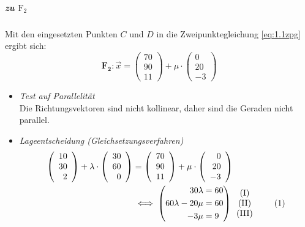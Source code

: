 \documentclass{ajc}
\numberwithin{equation}{subsection}
\newcommand\numberthis{\addtocounter{equation}{1}\tag{\theequation}}
\begin{document}
	\subparagraph{zu $\text{F}_2$} Mit den eingesetzten Punkten $C$ und $D$ in die Zweipunktegleichung \ref{eq:1.1zpg} ergibt sich: 
	\begin{equation}
		\mathbf{F_2}: \overrightarrow{x}=\left(\begin{array}{r} 70 \\ 90 \\ 11\end{array}\right) + \mu \cdot \left(\begin{array}{r} 0 \\ 20 \\ -3\end{array}\right)
	\end{equation}
	
	\begin{itemize}
		\item \textit{Test auf Parallelität} \\ 
		Die Richtungsvektoren sind nicht kollinear, daher sind die Geraden nicht parallel.
		
		\item \textit{Lageentscheidung (Gleichsetzungsverfahren)} \\
		\begin{alignat*}{2}
			\left(\begin{array}{r} 10 \\ 30 \\ 2\end{array}\right) + \lambda \cdot \left(\begin{array}{r} 30 \\ 60 \\ 0\end{array}\right) &= \left(\begin{array}{r} 70 \\ 90 \\ 11\end{array}\right) + \mu \cdot \left(\begin{array}{r} 0 \\ 20 \\ -3\end{array}\right) \\
			&\iff \left(\begin{aligned} 30 \lambda &= 60 \\ 60 \lambda - 20 \mu &= 60 \\ -3 \mu &= 9 \end{aligned}\right) \begin{array}{c} \text{(I)} \\ \text{(II)} \\ \text{(III)}\end{array} \numberthis
		\end{alignat*}
		

\end{itemize}
\end{document}
